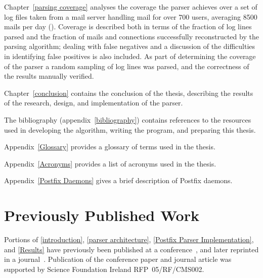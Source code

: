Chapter~\ref{parsing coverage} analyses the coverage the parser achieves
over a set of \numberOFlogFILES{} log files taken from a mail server
handling mail for over 700 users, averaging 8500 mails per day
().  Coverage is described both
in terms of the fraction of log lines parsed and the fraction of mails and
connections successfully reconstructed by the parsing algorithm; dealing
with false negatives and a discussion of the difficulties in identifying
false positives is also included.  As part of determining the coverage of
the parser a random sampling of log lines was parsed, and the correctness
of the results manually verified.

Chapter~\ref{conclusion} contains the conclusion of the thesis, describing
the results of the research, design, and implementation of the parser.

The bibliography (appendix~\ref{bibliography}) contains references to the
resources used in developing the algorithm, writing the program, and
preparing this thesis.

Appendix~\ref{Glossary} provides a glossary of terms used in the thesis.

Appendix~\ref{Acronyms} provides a list of acronyms used in the thesis.

Appendix~\ref{Postfix Daemons} gives a brief description of Postfix
daemons.

\section{Previously Published Work}

Portions of \textsection\ref{introduction}, \textsection\ref{parser
architecture}, \textsection\ref{Postfix Parser Implementation}, and
\textsection\ref{Results} have previously been published at a
conference~\cite{sgai-2008}, and later reprinted in a
journal~\cite{elsevier-2009}.  Publication of the conference paper and
journal article was supported by Science Foundation Ireland
RFP~05/RF/CMS002.
